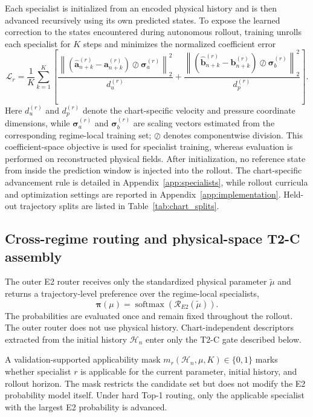 \documentclass{article}
\begin{document}
Each specialist is initialized from an encoded physical history and is then advanced recursively using its own predicted states. To expose the learned correction to the states encountered during autonomous rollout, training unrolls each specialist for $K$ steps and minimizes the
normalized coefficient error
\begin{equation}
  \mathcal L_r=\frac{1}{K}\sum_{k=1}^{K}\left[
  \frac{\left\|(\widehat{\bm a}_{n+k}^{(r)}-\bm a_{n+k}^{(r)})
  \oslash\bm\sigma_a^{(r)}\right\|_2^2}{d_u^{(r)}}
  +\frac{\left\|(\widehat{\bm b}_{n+k}^{(r)}-\bm b_{n+k}^{(r)})
  \oslash\bm\sigma_b^{(r)}\right\|_2^2}{d_p^{(r)}}\right].
  \label{eq:main_rollout_loss}
\end{equation}
Here $d_u^{(r)}$ and $d_p^{(r)}$ denote the chart-specific velocity and pressure coordinate dimensions, while $\bm\sigma_a^{(r)}$ and $\bm\sigma_b^{(r)}$ are scaling
vectors estimated from the corresponding regime-local training set; $\oslash$ denotes componentwise division. This coefficient-space objective is used for specialist training, whereas evaluation is performed on reconstructed physical fields. After initialization, no reference state from inside the prediction window is injected into the rollout. The chart-specific advancement rule is detailed in Appendix~\ref{app:specialists}, while rollout curricula and optimization settings are reported in Appendix~\ref{app:implementation}. Held-out trajectory splits are listed in Table~\ref{tab:chart_splits}.



\subsection{Cross-regime routing and physical-space T2-C assembly}

The outer E2 router receives only the standardized physical parameter $\widetilde\mu$ and returns a trajectory-level preference over the
regime-local specialists,
\[
\bm\pi(\mu)
=
\operatorname{softmax}\!\left(
\mathcal R_{E2}(\widetilde\mu)
\right).
\]
The probabilities are evaluated once and remain fixed throughout the rollout. The outer router does not use physical history. Chart-independent descriptors extracted from the initial history $\mathcal H_n$ enter only the T2-C gate described below.

A validation-supported applicability mask $m_r(\mathcal H_n,\mu,K)\in\{0,1\}$ marks whether specialist $r$ is applicable for the current parameter, initial history, and rollout horizon. The mask restricts the candidate set but does not modify the E2 probability
model itself. Under hard Top-1 routing, only the applicable specialist with the largest E2 probability is advanced.
\end{document}
